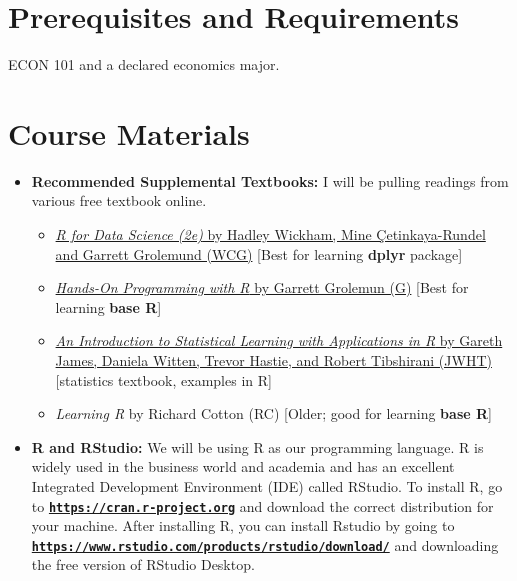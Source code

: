 \documentclass[11pt]{article}
\begin{document}
\section*{Prerequisites and Requirements}
ECON 101 and a declared economics major.

\section*{Course Materials}

\begin{itemize}

    \item \textbf{Recommended Supplemental Textbooks:} 
    I will be pulling readings from various free textbook online. 
    \begin{itemize}
        \item \href{https://r4ds.hadley.nz/}{\textit{R for Data Science (2e)} by Hadley Wickham, Mine \c{C}etinkaya-Rundel and Garrett Grolemund (WCG)} [Best for learning \textbf{dplyr} package]
        \item \href{https://rstudio-education.github.io/hopr/}{\textit{Hands-On Programming with R} by Garrett Grolemun (G)} [Best for learning \textbf{base R}]
        \item \href{https://web.stanford.edu/~hastie/ISLRv2_website.pdf}{\textit{An Introduction to Statistical Learning with Applications in R} by Gareth James, Daniela Witten, Trevor Hastie, and Robert Tibshirani (JWHT)} [statistics textbook, examples in R]
        \item \textit{Learning R} by Richard Cotton (RC) [Older; good for learning \textbf{base R}]
    \end{itemize}
    
    \item \textbf{R and RStudio:} We will be using R as our programming language. R is widely used in the business world and academia and has an excellent Integrated Development Environment (IDE) called RStudio. To install R, go to \href{https://cran.r-project.org}{\tt\bf https://cran.r-project.org} and download the correct distribution for your machine. After installing R, you can install Rstudio by going to \href{https://www.rstudio.com/products/rstudio/download/}{\tt\bf https://www.rstudio.com/products/rstudio/download/} and downloading the free version of RStudio Desktop.
    

\end{itemize}
\end{document}
